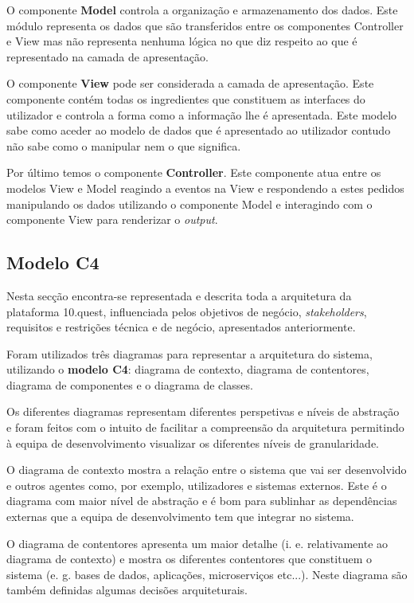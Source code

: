 O componente \textbf{Model} controla a organização e armazenamento dos dados. Este módulo representa os dados que são transferidos entre os componentes Controller e View mas não representa nenhuma lógica no que diz respeito ao que é representado na camada de apresentação.

O componente \textbf{View} pode ser considerada a camada de apresentação. Este componente contém todas os ingredientes que constituem as interfaces do utilizador e controla a forma como a informação lhe é apresentada. Este modelo sabe como aceder ao modelo de dados que é apresentado ao utilizador contudo não sabe como o manipular nem o que significa.

Por último temos o componente \textbf{Controller}.  Este componente atua entre os modelos View e Model reagindo a eventos na View e respondendo a estes pedidos manipulando os dados utilizando o componente Model e interagindo com o componente View para renderizar o \textit{output}.


\subsection{Modelo C4}

Nesta secção encontra-se representada e descrita toda a arquitetura da plataforma 10.quest,  influenciada pelos objetivos de negócio, \textit{stakeholders}, requisitos e restrições técnica e de negócio, apresentados anteriormente.

Foram utilizados três diagramas para representar a arquitetura do sistema, utilizando o \textbf{modelo C4}\cite{c4}: diagrama de contexto, diagrama de contentores, diagrama de componentes e o diagrama de classes.

Os diferentes diagramas representam diferentes perspetivas e níveis de abstração e foram feitos com o intuito de facilitar a compreensão da arquitetura permitindo à equipa de desenvolvimento visualizar os diferentes níveis de granularidade. 

O diagrama de contexto mostra a relação entre o sistema que vai ser desenvolvido e outros agentes como, por exemplo, utilizadores e sistemas externos.  Este é o diagrama com maior nível de abstração e é bom para sublinhar as dependências externas que a equipa de desenvolvimento tem que integrar no sistema. 

O diagrama de contentores apresenta um maior detalhe (i. e. relativamente ao diagrama de contexto) e mostra os diferentes contentores que constituem o sistema (e. g. bases de dados, aplicações, microserviços etc...). Neste diagrama são também definidas algumas decisões arquiteturais. 

